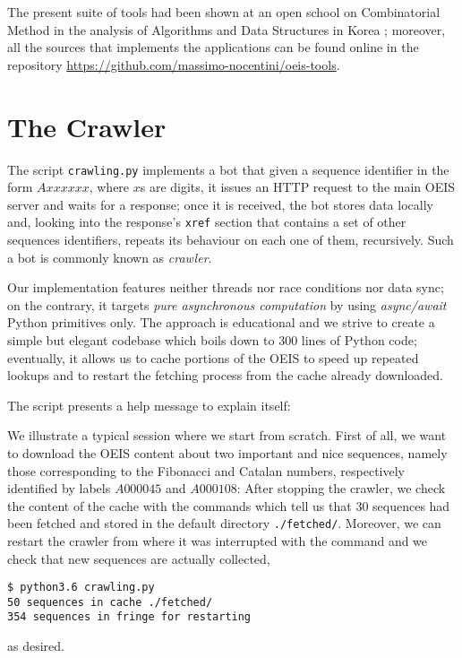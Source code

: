 The present suite of tools had been shown at an open school on Combinatorial
Method in the analysis of Algorithms and Data Structures in Korea
\citep{Nocentini:korea}; moreover, all the sources that implements the
applications can be found online in the repository
\url{https://github.com/massimo-nocentini/oeis-tools}.

\section{The Crawler}

The script \verb|crawling.py| implements a bot that given a sequence identifier
in the form $Axxxxxx$, where $x$s are digits, it issues an HTTP request to the
main OEIS server and waits for a response; once it is received, the bot stores
data locally and, looking into the response's \verb|xref| section that contains a
set of other sequences identifiers, repeats its behaviour on each one of them,
recursively.  Such a bot is commonly known as \emph{crawler}.

Our implementation features neither threads nor race conditions nor data sync;
on the contrary, it targets \textit{pure asynchronous computation} by using
\textit{async/await} Python primitives only. The approach is educational and we
strive to create a simple but elegant codebase which boils down to $300$ lines
of Python code; eventually, it allows us to cache portions of the OEIS to speed
up repeated lookups and to restart the fetching process from the cache already
downloaded.

The script presents a help message to explain itself:

\begin{example}
We illustrate a typical session where we start from scratch. First of all, we
want to download the OEIS content about two important and nice sequences,
namely those corresponding to the Fibonacci and Catalan numbers, respectively
identified by labels $A000045$ and $A000108$:
After stopping the crawler, we check the content of the cache with the commands
which tell us that $30$ sequences had been fetched and stored in the default
directory \verb|./fetched/|.  Moreover, we can restart the crawler from where
it was interrupted with the command
and we check that new sequences are actually collected,
\begin{Verbatim}[fontsize=\small]
$ python3.6 crawling.py
50 sequences in cache ./fetched/
354 sequences in fringe for restarting
\end{Verbatim}
as desired.
\end{example}

